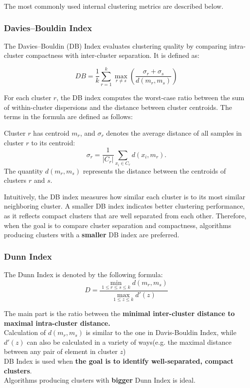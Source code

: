 \documentclass{article}
\begin{document}
The most commonly used internal clustering metrics are described below.

\subsubsection{Davies–Bouldin Index}

The Davies–Bouldin (DB) Index evaluates clustering quality by comparing intra-cluster compactness with inter-cluster separation. It is defined as:

\[
DB = \frac{1}{k}\sum_{r=1}^{k}\max_{r \neq s}\left(\frac{\sigma_r + \sigma_s}{d(m_r,m_s)}\right)
\]

For each cluster $r$, the DB index computes the worst-case ratio between the sum of within-cluster dispersions and the distance between cluster centroids. The terms in the formula are defined as follows:

Cluster $r$ has centroid $m_r$, and $\sigma_r$ denotes the average distance of all samples in cluster $r$ to its centroid:
\[
\sigma_r = \frac{1}{|C_r|} \sum_{x_i \in C_r} d(x_i, m_r).
\]
The quantity $d(m_r,m_s)$ represents the distance between the centroids of clusters $r$ and $s$.

Intuitively, the DB index measures how similar each cluster is to its most similar neighboring cluster. A smaller DB index indicates better clustering performance, as it reflects compact clusters that are well separated from each other. Therefore, when the goal is to compare cluster separation and compactness, algorithms producing clusters with a \textbf{smaller} DB index are preferred.

\subsubsection{Dunn Index}
The Dunn Index is denoted by the following formula:\[
D = \frac{\displaystyle \min_{1\leq r\leq s\leq k}d(m_r,m_s)}{\displaystyle \max_{1\leq z\leq k}d'(z)}
\]

The main part is the ratio between the \textbf{minimal inter-cluster distance to maximal intra-cluster distance.}\\
Calculation of $d(m_r,m_s)$ is similar to the one in Davis-Bouldin Index, while $d'(z)$ can also be calculated in a variety of ways(e.g. the maximal distance between any pair of element in cluster $z$)\\
DB Index is used when \textbf{the goal is to identify well-separated, compact clusters}.\\
Algorithms producing clusters with \textbf{bigger} Dunn Index is ideal.
\end{document}

